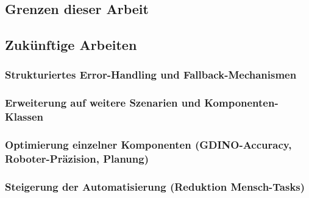 \documentclass[12pt]{article}
\begin{document}
\subsection{Grenzen dieser Arbeit}

\subsection{Zukünftige Arbeiten}
    \subsubsection{Strukturiertes Error-Handling und Fallback-Mechanismen}
    \subsubsection{Erweiterung auf weitere Szenarien und Komponenten-Klassen}
    \subsubsection{Optimierung einzelner Komponenten (GDINO-Accuracy, Roboter-Präzision, Planung)}
    \subsubsection{Steigerung der Automatisierung (Reduktion Mensch-Tasks)}


\newpage

\printbibliography[heading=bibintoc,title=Literaturverzeichnis]
\end{document}
